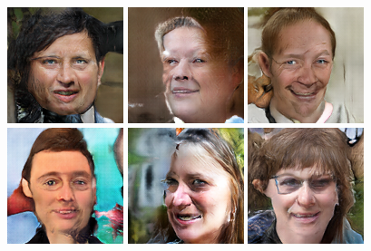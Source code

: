 \begin{figure}[!h]
{    }
    \vspace{0.1cm}
    \centerline{
        \includegraphics[scale=0.485]{figures/ffhq/random/ffhq128x128_image0033.png}
        \includegraphics[scale=0.485]{figures/ffhq/random/ffhq128x128_image0034.png}
        \includegraphics[scale=0.485]{figures/ffhq/random/ffhq128x128_image0035.png}
        \includegraphics[scale=0.485]{figures/ffhq/random/ffhq128x128_image0036.png}
        \includegraphics[scale=0.485]{figures/ffhq/random/ffhq128x128_image0037.png}
        \includegraphics[scale=0.485]{figures/ffhq/random/ffhq128x128_image0038.png}
}
\end{figure}
